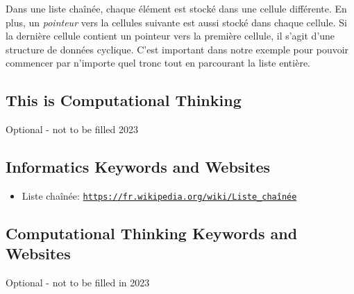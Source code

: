 \documentclass[a4paper,11pt]{report}
\newcommand{\BrochureUrlText}[1]{\texttt{#1}}
\begin{document}
Dans une liste chaînée, chaque élément est stocké dans une cellule différente. En plus, un \emph{pointeur} vers la cellules suivante est aussi stocké dans chaque cellule. Si la dernière cellule contient un pointeur vers la première cellule, il s’agit d’une structure de données cyclique. C’est important dans notre exemple pour pouvoir commencer par n’importe quel tronc tout en parcourant la liste entière.


\subsection*{This is Computational Thinking}

Optional - not to be filled 2023


\subsection*{Informatics Keywords and Websites}

\begin{itemize}
  \item Liste chaînée: \href{https://fr.wikipedia.org/wiki/Liste_cha\%C3\%AEn\%C3\%A9e}{\BrochureUrlText{https://fr.wikipedia.org/wiki/Liste\_chaînée}}
\end{itemize}


\subsection*{Computational Thinking Keywords and Websites}

Optional - not to be filled in 2023
\end{document}
